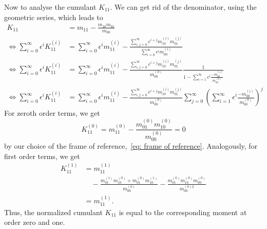 Now to analyse the cumulant $K_{11}$. We can get rid of the denominator,
using the geometric series, which leads to
\begin{equation}
  \begin{aligned}
    K_{11} & = m_{11} - \frac{m_{10}m_{01}}{m_{00}}\\
    \Leftrightarrow
    \sum_{i=0}^\infty \epsilon^i K_{11}^{(i)}
    & = \sum_{i=0}^\infty \epsilon^i m_{11}^{(i)} -
    \frac{\sum_{i,j=0}^\infty \epsilon^{i+j} m_{10}^{(i)}m_{01}^{(j)}}
        {\sum_{i=0}^\infty \epsilon^i m_{00}^{(i)}}\\
    \Leftrightarrow
    \sum_{i=0}^\infty \epsilon^i K_{11}^{(i)}
    & = \sum_{i=0}^\infty \epsilon^i m_{11}^{(i)} -
    \frac{\sum_{i,j=0}^\infty \epsilon^{i+j} m_{10}^{(i)}m_{01}^{(j)}}
        {m_{00}^{(0)}}
        \frac{1}{1 - \sum_{i=1}^\infty \epsilon^i \frac{ - m_{00}^{(i)}}{ m_{00}^{(0)}}}\\
    \Leftrightarrow
    \sum_{i=0}^\infty \epsilon^i K_{11}^{(i)}
    & = \sum_{i=0}^\infty \epsilon^i m_{11}^{(i)} -
    \frac{\sum_{i,j=0}^\infty \epsilon^{i+j} m_{10}^{(i)}m_{01}^{(j)}}
        {m_{00}^{(0)}}
    \sum_{j=0}^\infty {\left(\sum_{i=1}^\infty \epsilon^i \frac{ - m_{00}^{(i)}}{ m_{00}^{(0)}}\right)}^j
  \end{aligned}
\end{equation}
For zeroth order terms, we get
\begin{equation}
  K_{11}^{(0)} = m_{11}^{(0)} - \frac{m_{01}^{(0)}m_{10}^{(0)}}{m_{00}^{(0)}} = 0
\end{equation}
by our choice of the frame of reference,~\eqref{eq: frame of reference}.
Analogously, for first order terms, we get
\begin{equation}
  \begin{aligned}
    K_{11}^{(1)} & = m_{11}^{(1)} \\
    &\quad - \frac{m_{01}^{(1)}m_{10}^{(0)}+m_{01}^{(0)}m_{10}^{(1)}}{m_{00}^{(0)}}
    -\frac{m_{01}^{(0)}m_{10}^{(0)}m_{00}^{(0)}}{m_{00}^{(0)2}}  \\
    &= m_{11}^{(1)}.
  \end{aligned}
\end{equation}
Thus, the normalized cumulant $K_{11}$ is equal to the corresponding moment at order zero and one.

